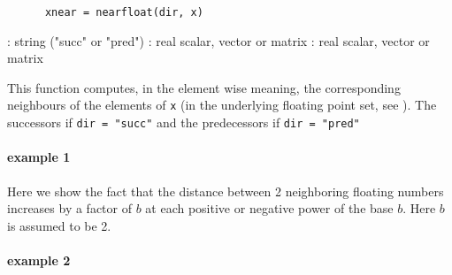 

\begin{mandesc}
\end{mandesc}

\begin{calling_sequence}
    \begin{verbatim}
      xnear = nearfloat(dir, x)  
    \end{verbatim}
\end{calling_sequence}

\begin{parameters}
  \begin{varlist}
   : string ("succ" or "pred")
   : real scalar, vector or matrix
   : real scalar, vector or matrix
  \end{varlist}
\end{parameters}

\begin{mandescription}
    This function computes, in the element wise meaning, the corresponding neighbours 
    of the elements of \verb!x! (in the underlying floating point set,
    see ).
    The successors if \verb!dir = "succ"! and the predecessors if  \verb!dir = "pred"!
\end{mandescription}

\begin{examples}

\paragraph{example 1} Here we show the fact that the distance
between 2 neighboring floating numbers increases by a factor
of $b$ at each positive or negative power of the base $b$.
Here $b$ is assumed to be 2.   
\begin{program}
\end{program}

\paragraph{example 2}
\begin{program}
\end{program}

\end{examples}

